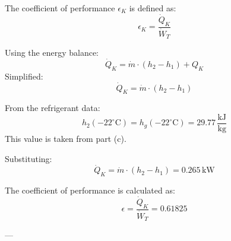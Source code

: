The coefficient of performance \( \epsilon_K \) is defined as:  
\[
\epsilon_K = \frac{\dot{Q}_K}{\dot{W}_T}
\]  

Using the energy balance:  
\[
\dot{Q}_K = \dot{m} \cdot (h_2 - h_1) + Q_K
\]  
Simplified:  
\[
\dot{Q}_K = \dot{m} \cdot (h_2 - h_1)
\]  

From the refrigerant data:  
\[
h_2(-22^\circ\text{C}) = h_g(-22^\circ\text{C}) = 29.77 \, \frac{\text{kJ}}{\text{kg}}
\]  
This value is taken from part (c).  

Substituting:  
\[
\dot{Q}_K = \dot{m} \cdot (h_2 - h_1) = 0.265 \, \text{kW}
\]  

The coefficient of performance is calculated as:  
\[
\epsilon = \frac{\dot{Q}_K}{\dot{W}_T} = 0.61825
\]  

---